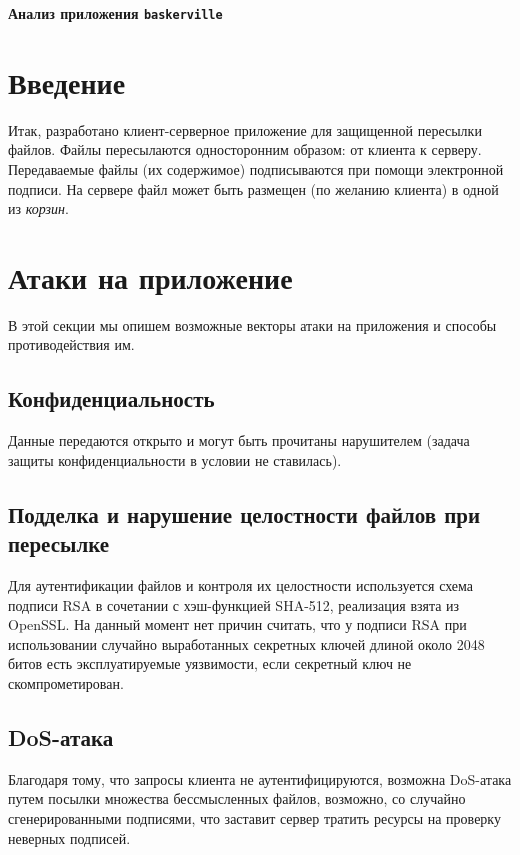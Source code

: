 \documentclass[a4paper,12pt]{article}
\begin{document}
\large
\sffamily
\thispagestyle{fancy}

\begin{center}\LARGE\renewcommand{\baselinestretch}{.9}
\textbf{Анализ приложения {\tt baskerville}}\\
\end{center}

\section*{Введение}

Итак, разработано клиент-серверное приложение для защищенной пересылки файлов.
Файлы пересылаются односторонним образом: от клиента к серверу. Передаваемые файлы (их содержимое)
подписываются при помощи электронной подписи.
На сервере файл может быть размещен (по желанию клиента) в одной из \emph{корзин}.

\section{Атаки на приложение}

В этой секции мы опишем возможные векторы атаки на приложения и способы противодействия им.

\subsection{Конфиденциальность}

Данные передаются открыто и могут быть прочитаны нарушителем (задача защиты конфиденциальности в условии не ставилась).

\subsection{Подделка и нарушение целостности файлов при пересылке}

Для аутентификации файлов и контроля их целостности используется схема подписи RSA в сочетании с хэш-функцией SHA-512, реализация взята 
из OpenSSL. На данный момент нет причин считать, что у подписи RSA при использовании случайно выработанных секретных ключей длиной около 2048 битов
есть эксплуатируемые уязвимости, если секретный ключ не скомпрометирован.

\subsection{DoS-атака}

Благодаря тому, что запросы клиента не аутентифицируются, возможна DoS-атака путем посылки множества бессмысленных файлов, возможно, со случайно сгенерированными подписями, что заставит сервер тратить ресурсы на проверку неверных подписей.
\end{document}
